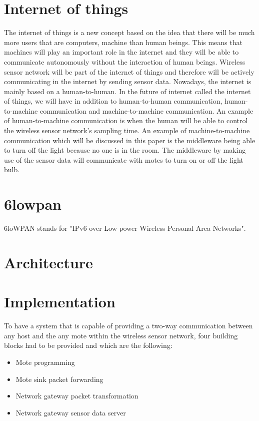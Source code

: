 \documentclass[conference]{IEEEtran}
\begin{document}
\section{Internet of things}
The internet of things is a new concept based on the idea that there will be much more users that are computers, machine than human beings. This means that machines will play an important role in the internet and they will be able to communicate autonomously without the interaction of human beings. Wireless sensor network will be part of the internet of things and therefore will be actively communicating in the internet by sending sensor data. Nowadays, the internet is mainly based on a human-to-human. In the future of internet called the internet of things, we will have in addition to human-to-human communication, human-to-machine communication and machine-to-machine communication. An example of human-to-machine communication is when the human will be able to control the wireless sensor network's sampling time. An example of machine-to-machine communication which will be discussed in this paper is the middleware being able to turn off the light because no one is in the room. The middleware by making use of the sensor data will communicate with motes to turn on or off the light bulb.
\section{6lowpan}
6loWPAN stands for  "IPv6 over Low power Wireless Personal Area Networks". 

\section{Architecture}

\section{Implementation}
To have a system that is capable of providing a two-way communication between any host and the any mote within the wireless sensor network, four building blocks had to be provided and which are the following:
\begin{itemize}
\item Mote programming
\item Mote sink packet forwarding
\item Network gateway packet transformation
\item Network gateway sensor data server
\end{itemize}
\end{document}
